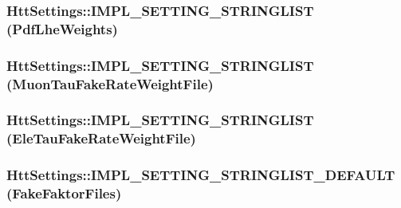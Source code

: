 \label{classHttSettings_adfc879b87f116121f3f5a0c4644cd59a}
\hypertarget{classHttSettings_ac970b89b18a3285a6b20709b1372a4d7}{
\subsubsection[{IMPL\_\-SETTING\_\-STRINGLIST}]{\setlength{\rightskip}{0pt plus 5cm}HttSettings::IMPL\_\-SETTING\_\-STRINGLIST (PdfLheWeights)}}
\label{classHttSettings_ac970b89b18a3285a6b20709b1372a4d7}
\hypertarget{classHttSettings_a4513b0e4e3fb25e4513b2cc2efc5e719}{
\subsubsection[{IMPL\_\-SETTING\_\-STRINGLIST}]{\setlength{\rightskip}{0pt plus 5cm}HttSettings::IMPL\_\-SETTING\_\-STRINGLIST (MuonTauFakeRateWeightFile)}}
\label{classHttSettings_a4513b0e4e3fb25e4513b2cc2efc5e719}
\hypertarget{classHttSettings_af061ebad059cc50153cb70089a5687ea}{
\subsubsection[{IMPL\_\-SETTING\_\-STRINGLIST}]{\setlength{\rightskip}{0pt plus 5cm}HttSettings::IMPL\_\-SETTING\_\-STRINGLIST (EleTauFakeRateWeightFile)}}
\label{classHttSettings_af061ebad059cc50153cb70089a5687ea}
\hypertarget{classHttSettings_a95a362123622626e2ba115c9a0f701b5}{
\subsubsection[{IMPL\_\-SETTING\_\-STRINGLIST\_\-DEFAULT}]{\setlength{\rightskip}{0pt plus 5cm}HttSettings::IMPL\_\-SETTING\_\-STRINGLIST\_\-DEFAULT (FakeFaktorFiles)}}
\label{classHttSettings_a95a362123622626e2ba115c9a0f701b5}
